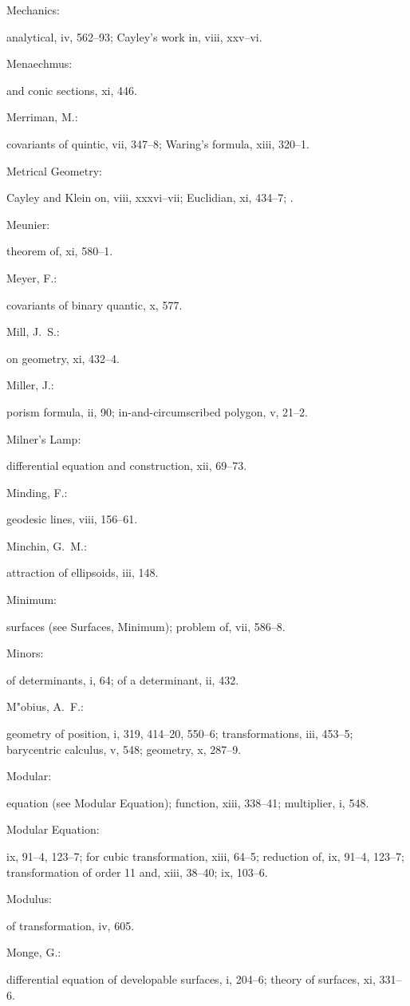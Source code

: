 \documentclass[11pt,a4paper]{book}
\providecommand{\V}[1]{#1}
\providecommand{\IndexEntry}[2]{#1\dotfill #2\par}
\begin{document}
\IndexEntry{Mechanics}: analytical, \V{iv}, 562--93; Cayley's work in, \V{viii}, xxv--vi.

\IndexEntry{Menaechmus}: and conic sections, \V{xi}, 446.

\IndexEntry{Merriman, M.}: covariants of quintic, \V{vii}, 347--8; Waring's formula, \V{xiii}, 320--1.

\IndexEntry{Metrical Geometry}: Cayley and Klein on, \V{viii}, xxxvi--vii; Euclidian, \V{xi}, 434--7; .

\IndexEntry{Meunier}: theorem of, \V{xi}, 580--1.

\IndexEntry{Meyer, F.}: covariants of binary quantic, \V{x}, 577.

\IndexEntry{Mill, J.\ S.}: on geometry, \V{xi}, 432--4.

\IndexEntry{Miller, J.}: porism formula, \V{ii}, 90; in-and-circumscribed polygon, \V{v}, 21--2.

\newpage

\setcounter{page}{112}

\IndexEntry{Milner's Lamp}: differential equation and construction, \V{xii}, 69--73.

\IndexEntry{Minding, F.}: geodesic lines, \V{viii}, 156--61.

\IndexEntry{Minchin, G.\ M.}: attraction of ellipsoids, \V{iii}, 148.

\IndexEntry{Minimum}: surfaces (see Surfaces, Minimum); problem of, \V{vii}, 586--8.

\IndexEntry{Minors}: of determinants, \V{i}, 64; of a determinant, \V{ii}, 432.

\IndexEntry{M"obius, A.\ F.}: geometry of position, \V{i}, 319, 414--20, 550--6; transformations, \V{iii}, 453--5; barycentric calculus, \V{v}, 548; geometry, \V{x}, 287--9.

\IndexEntry{Modular}: equation (see Modular Equation); function, \V{xiii}, 338--41; multiplier, \V{i}, 548.

\IndexEntry{Modular Equation}: \V{ix}, 91--4, 123--7; for cubic transformation, \V{xiii}, 64--5; reduction of, \V{ix}, 91--4, 123--7; transformation of order 11 and, \V{xiii}, 38--40; \V{ix}, 103--6.

\IndexEntry{Modulus}: of transformation, \V{iv}, 605.

\IndexEntry{Monge, G.}: differential equation of developable surfaces, \V{i}, 204--6; theory of surfaces, \V{xi}, 331--6.
\end{document}
